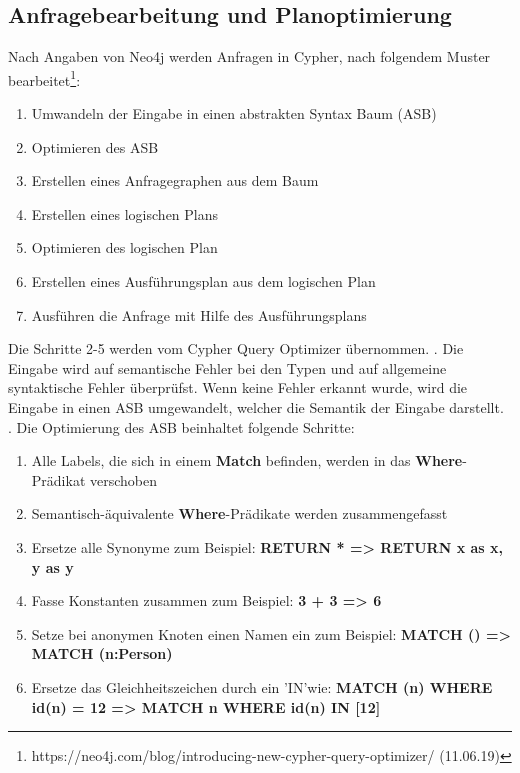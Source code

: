 \subsection{Anfragebearbeitung und Planoptimierung}
Nach Angaben von Neo4j werden Anfragen in Cypher, nach folgendem Muster bearbeitet\footnote{https://neo4j.com/blog/introducing-new-cypher-query-optimizer/  (11.06.19)}:
\begin{enumerate}
	\item Umwandeln der Eingabe in einen abstrakten Syntax Baum (ASB)
	\item Optimieren des ASB
	\item Erstellen eines Anfragegraphen aus dem Baum
	\item Erstellen eines logischen Plans
	\item Optimieren des logischen Plan 
	\item Erstellen eines Ausführungsplan aus dem logischen Plan
	\item Ausführen die Anfrage mit Hilfe des Ausführungsplans  
\end{enumerate}
Die Schritte 2-5 werden vom Cypher Query Optimizer übernommen. \newline {}. Die Eingabe wird auf semantische Fehler bei den Typen und auf allgemeine syntaktische Fehler überprüfst. Wenn keine Fehler erkannt wurde, wird die Eingabe in einen ASB umgewandelt, welcher die Semantik der Eingabe darstellt. \newline
{}. Die Optimierung des ASB beinhaltet folgende Schritte: 
\begin{enumerate}[label=(\roman*)]
	\item Alle Labels, die sich in einem \textbf{Match} befinden, werden in das \textbf{Where}-Prädikat verschoben
	\item  Semantisch-äquivalente \textbf{Where}-Prädikate werden zusammengefasst
	\item Ersetze alle Synonyme zum Beispiel: \textbf{RETURN * => RETURN x as x, y as y}
	\item Fasse Konstanten zusammen zum Beispiel: \textbf{3 + 3 => 6}
	\item Setze bei anonymen Knoten einen Namen ein zum Beispiel: \textbf{ MATCH () => MATCH (n:Person)}
	\item Ersetze das Gleichheitszeichen durch ein 'IN'wie: \textbf{MATCH (n) WHERE id(n) = 12 => MATCH n WHERE id(n) IN [12]}
\end{enumerate}

